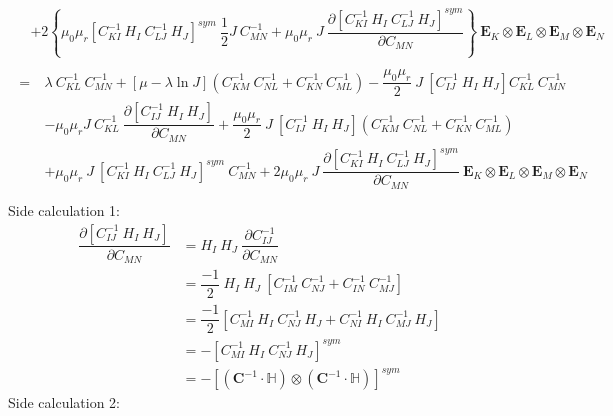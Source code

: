 \documentclass[11pt,a4paper,final]{article}
\begin{document}
\begin{align*}
\begin{split}
&+ 2 \left\lbrace \mu_0 \mu_r [C^{-1}_{KI} \ H_I \ C^{-1}_{LJ} \ H_J]^{sym} \ \dfrac{1}{2} J \ C^{-1}_{MN} + \mu_0 \mu_r \ J \ \dfrac{\partial [C^{-1}_{KI} \ H_I \ C^{-1}_{LJ} \ H_J]^{sym}}{\partial C_{MN}} \right\rbrace \ \mathbf{E}_K \otimes \mathbf{E}_L \otimes \mathbf{E}_M \otimes \mathbf{E}_N
\end{split}\\
\begin{split}
=\ & \lambda \ C^{-1}_{KL} \ C^{-1}_{MN} + [\mu - \lambda \ln J] \left( C^{-1}_{KM} \ C^{-1}_{NL} + C^{-1}_{KN} \ C^{-1}_{ML} \right) - \dfrac{\mu_0 \mu_r}{2} \ J \ [C^{-1}_{IJ} \ H_I \ H_J] C^{-1}_{KL} \ C^{-1}_{MN}  \\
&- \mu_0 \mu_r J \ C^{-1}_{KL} \ \dfrac{\partial [C^{-1}_{IJ} \ H_I \ H_J]}{\partial C_{MN}} + \dfrac{\mu_0 \mu_r}{2} \ J \ [C^{-1}_{IJ} \ H_I \ H_J] (C^{-1}_{KM} \ C^{-1}_{NL} + C^{-1}_{KN} \ C^{-1}_{ML}) \\
&+ \mu_0 \mu_r \ J \ [C^{-1}_{KI} \ H_I \ C^{-1}_{LJ} \ H_J]^{sym} \ C^{-1}_{MN} + 2 \mu_0 \mu_r \ J \ \dfrac{\partial [C^{-1}_{KI} \ H_I \ C^{-1}_{LJ} \ H_J]^{sym}}{\partial C_{MN}} \ \mathbf{E}_K \otimes \mathbf{E}_L \otimes \mathbf{E}_M \otimes \mathbf{E}_N
\end{split}\\
\end{align*}
Side calculation 1:
\begin{align*}
\dfrac{\partial [C^{-1}_{IJ} \ H_I \ H_J]}{\partial C_{MN}} &= H_I \ H_J \ \dfrac{\partial C^{-1}_{IJ}}{\partial C_{MN}}\\
&= \dfrac{-1}{2} \ H_I \ H_J \ [C^{-1}_{IM} \ C^{-1}_{NJ} + C^{-1}_{IN} \ C^{-1}_{MJ}]\\
&= \dfrac{-1}{2} [C^{-1}_{MI} \ H_I \ C^{-1}_{NJ} \ H_J + C^{-1}_{NI} \ H_I \ C^{-1}_{MJ} \ H_J]\\
&= - [C^{-1}_{MI} \ H_I \ C^{-1}_{NJ} \ H_J]^{sym}\\
&= - [ (\mathbf{C}^{-1} \cdot \mathbb{H}) \otimes (\mathbf{C}^{-1} \cdot \mathbb{H}) ]^{sym}
\end{align*}
Side calculation 2:
\end{document}
